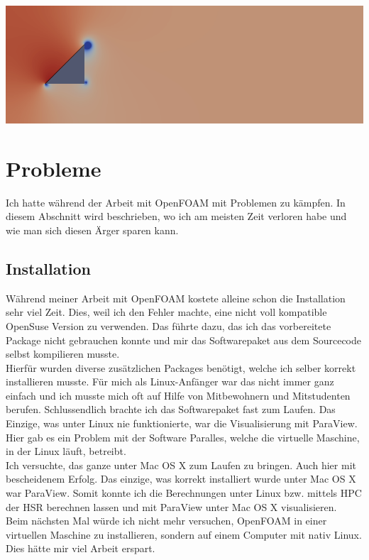\begin{refsection}
\begin{minipage}{0.5 \linewidth}
\end{minipage}
\begin{minipage}{0.5 \linewidth}
\includegraphics[width = \linewidth]{./OpenFOAM/pics/p1.png}
\end{minipage}


\section{Probleme}
Ich hatte während der Arbeit mit OpenFOAM mit Problemen zu kämpfen. In diesem Abschnitt wird beschrieben, wo ich am meisten Zeit verloren habe und wie man sich diesen Ärger sparen kann.
\subsection{Installation}
Während meiner Arbeit mit OpenFOAM kostete alleine schon die Installation sehr viel Zeit. Dies, weil ich den Fehler machte, eine nicht voll kompatible OpenSuse Version zu verwenden. Das führte dazu, das ich das vorbereitete Package nicht gebrauchen konnte und mir das Softwarepaket aus dem Sourcecode selbst kompilieren musste. \\
Hierfür wurden diverse zusätzlichen Packages benötigt, welche ich selber korrekt installieren musste. Für mich als Linux-Anfänger war das nicht immer ganz einfach und ich musste mich oft auf Hilfe von Mitbewohnern und Mitstudenten berufen. Schlussendlich brachte ich das Softwarepaket fast zum Laufen. Das Einzige, was unter Linux nie funktionierte, war die Visualisierung mit ParaView. Hier gab es ein Problem mit der Software Paralles, welche die virtuelle Maschine, in der Linux läuft, betreibt. \\
Ich versuchte, das ganze unter Mac OS X zum Laufen zu bringen. Auch hier mit bescheidenem Erfolg. Das einzige, was korrekt installiert wurde unter Mac OS X war ParaView. Somit konnte ich die Berechnungen unter Linux bzw. mittels HPC der HSR berechnen lassen und mit ParaView unter Mac OS X visualisieren.\\
 Beim nächsten Mal würde ich nicht mehr versuchen, OpenFOAM in einer virtuellen Maschine zu installieren, sondern auf einem Computer mit nativ Linux. Dies hätte mir viel Arbeit erspart.


\end{refsection}
